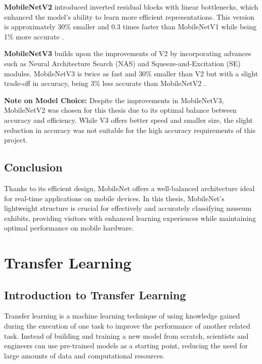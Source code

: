 \textbf{MobileNetV2} introduced inverted residual blocks with linear bottlenecks, which enhanced the model's ability to learn more efficient representations. This version is approximately 30\% smaller and 0.3 times faster than MobileNetV1 while being 1\% more accurate \cite{pandrii_mobilenet}.

\textbf{MobileNetV3} builds upon the improvements of V2 by incorporating advances such as Neural Architecture Search (NAS) and Squeeze-and-Excitation (SE) modules. MobileNetV3 is twice as fast and 30\% smaller than V2 but with a slight trade-off in accuracy, being 3\% less accurate than MobileNetV2 \cite{pandrii_mobilenet}.

\textbf{Note on Model Choice:} Despite the improvements in MobileNetV3, MobileNetV2 was chosen for this thesis due to its optimal balance between accuracy and efficiency. While V3 offers better speed and smaller size, the slight reduction in accuracy was not suitable for the high accuracy requirements of this project.

\subsection{Conclusion}

Thanks to its efficient design, MobileNet offers a well-balanced architecture ideal for real-time applications on mobile devices. In this thesis, MobileNet's lightweight structure is crucial for effectively and accurately classifying museum exhibits, providing visitors with enhanced learning experiences while maintaining optimal performance on mobile hardware.

\section{Transfer Learning}\label{section:transfer_learning}

\subsection{Introduction to Transfer Learning}

Transfer learning is a machine learning technique of using knowledge gained during the execution of one task to improve the performance of another related task. Instead of building and training a new model from scratch, scientists and engineers can use pre-trained models as a starting point, reducing the need for large amounts of data and computational resources.

